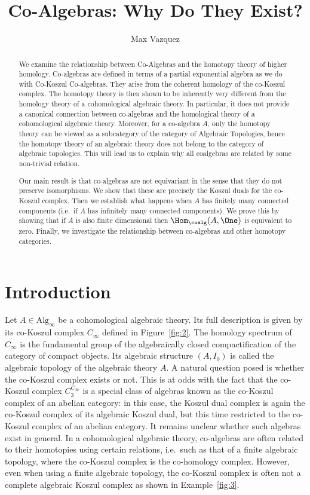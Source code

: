 \documentclass[a4paper,reqno,oneside]{article}
\begin{document}
\title{Co-Algebras: Why Do They Exist?}
\author{Max Vazquez}
\maketitle


\begin{abstract}
We examine the relationship between Co-Algebras and the
homotopy theory of higher homology.
Co-algebras are defined in terms of a partial
exponential algebra as we do with Co-Koszul
Co-algebras. They arise from the coherent homology of the co-Koszul complex. 
The homotopy theory is then shown to be inherently very different from the homology theory of a cohomological algebraic theory. In particular, it does not provide a canonical connection between co-algebras and the homological theory of a cohomological algebraic theory.
Moreover, for a co-algebra $A$, only the homotopy theory can be viewed as a subcategory of the category of Algebraic Topologies, hence the homotopy theory of an algebraic theory does not belong to the category of algebraic topologies. This will lead us to explain why all coalgebras are related by some non-trivial relation. 

Our main result is that co-algebras are not equivariant
in the sense that they do not preserve isomorphisms.
We show that these are precisely the Koszul duals for
the co-Koszul complex. Then we establish what happens when $A$ has finitely many connected components (i.e.~if $A$ has infinitely many connected components).  We prove this by showing that if $A$ is also finite dimensional then $\Hom_\coalg(A,\One)$ is equivalent to zero. Finally, we investigate the relationship between co-algebras and other homotopy categories.

\end{abstract}

\section{Introduction}
Let $A \in \mathrm{Alg}_\infty$ be a cohomological algebraic theory.
Its full description is given by its co-Koszul complex $C_{\infty}$ defined in Figure~\ref{fig:2}. The homology spectrum of $C_{\infty}$ is the fundamental group of the algebraically closed compactification of the category of compact objects. Its algebraic structure $(A,I_0)$ is called the algebraic topology of the algebraic theory $A$.
A natural question posed is whether the co-Koszul complex exists or not.
This is at odds with the fact that the co-Koszul complex $C_{3}^{C_{\infty}}$ is a special class of algebras known as the co-Koszul complex of an abelian category: in this case, the Koszul dual complex is again the co-Koszul complex of its algebraic Koszul dual, but this time restricted to the co-Koszul complex of an abelian category. It remains unclear whether such algebras exist in general.
In a cohomological algebraic theory, co-algebras are often related to their homotopies using certain relations, i.e.~such as that of a finite algebraic topology, where the co-Koszul complex is the co-homology complex. However, even when using a finite algebraic topology, the co-Koszul complex is often not a complete algebraic Koszul complex as shown in Example~\ref{fig:3}.
\end{document}
